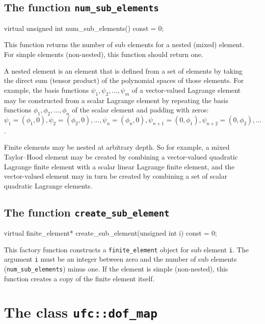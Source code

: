 \subsection{The function \texttt{num\_sub\_elements}}

\begin{code}
virtual unsigned int num_sub_elements() const = 0;
\end{code}

This function returns the number of sub elements for a nested (mixed)
element. For simple elements (non-nested), this function should return
one.

A nested element is an element that is defined from a set of elements
by taking the direct sum (tensor product) of the polynomial spaces of
those elements. For example, the basis functions $\psi_1, \psi_2,
\ldots, \psi_m$ of a vector-valued Lagrange element may be constructed
from a scalar Lagrange element by repeating the basis functions
$\phi_1, \phi_2, \ldots, \phi_n$ of the scalar element and padding
with zeros: $\psi_1 = (\phi_1, 0), \psi_2 = (\phi_2, 0), \ldots,
\psi_n = (\phi_n, 0), \psi_{n+1} = (0, \phi_1), \psi_{n+2} = (0,
\phi_2), \ldots$.

Finite elements may be nested at arbitrary depth. So for example, a
mixed Taylor--Hood element may be created by combining a vector-valued
quadratic Lagrange finite element with a scalar linear Lagrange finite
element, and the vector-valued element may in turn be created by
combining a set of scalar quadratic Lagrange elements.

\subsection{The function \texttt{create\_sub\_element}}

\begin{code}
virtual finite_element*
create_sub_element(unsigned int i) const = 0;
\end{code}

This factory function constructs a \texttt{finite\_element} object for
sub element \texttt{i}. The argument \texttt{i} must be an integer
between zero and the number of sub elements
(\texttt{num\_sub\_elements}) minus one. If the element is simple
(non-nested), this function creates a copy of the finite element
itself.

\section{The class \texttt{ufc::dof\_map}}

